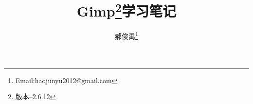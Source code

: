 \documentclass[10pt,a4paper]{article}
\begin{document}
\begin{CJK*}{UTF8}{gkai}
\title{Gimp\thanks{版本--2.6.12}学习笔记}					   						%
\author{郝俊禹\thanks{Email:haojunyu2012@gmail.com}}				%
\date{}                                             				%
\maketitle                                          				%
\tableofcontents 												%
\clearpage









\clearpage     
\end{CJK*}
\end{document}
